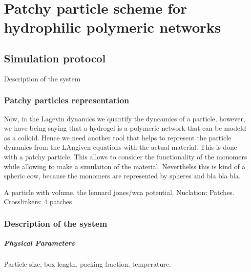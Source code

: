 \chapter{Patchy particle scheme for hydrophilic polymeric networks}

\section{Simulation protocol}

Description of the system


\subsection{Patchy particles representation}

Now, in the Lagevin dynamics we quantify the dyncamics of a particle, however, we have being saying that a hydrogel is a polymeric network that can be modeld as a colloid.
Hence we need another tool that helps to represent the particle dynamics from the LAngiven equations with the actual material.
This is done with a patchy particle.
This allows to consider the functionality of the monomers while allowing to make a simulaiton of the material.
Neverthelss this is kind of a spheric cow, because the monomers are represented by spheres and bla bla bla.

A particle with volume, the lennard jones/wca potential.
Nuclation: Patches.
Crosslinkers: 4 patches

\subsection{Description of the system}

\paragraph{Physical Parameters} Particle size, box length, packing fraction, temperature.

